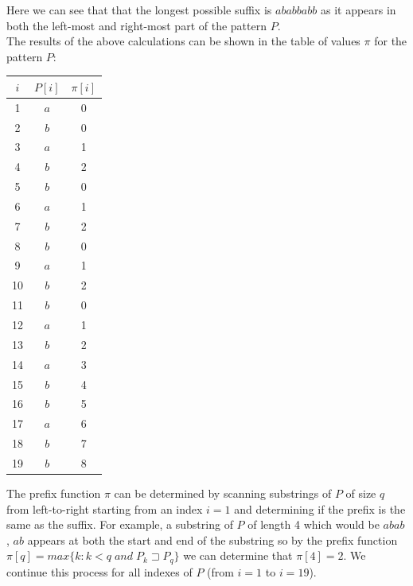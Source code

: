 \documentclass{article}
\begin{document}
Here we can see that that the longest possible suffix is $ababbabb$ as it appears in both the left-most and right-most part of the pattern $P$.\\

The results of the above calculations can be shown in the table of values $\pi$ for the pattern $P$:
\begin{center}
\begin{tabular}{||c c c||} 
 \hline
 $i$ & $P[i]$ & $\pi[i]$\\ [0.5ex] 
 \hline\hline
 1 & $a$ & 0 \\ 
 \hline
 2 & $b$ & 0 \\
 \hline
 3 & $a$ & 1 \\
 \hline
 4 & $b$ & 2 \\
 \hline
  5 & $b$ & 0 \\
 \hline
  6 & $a$ & 1 \\
 \hline
  7 & $b$ & 2 \\
 \hline
  8 & $b$ & 0 \\
 \hline
  9 & $a$ & 1 \\
 \hline
  10 & $b$ & 2 \\
 \hline
  11 & $b$ & 0 \\
 \hline
  12 & $a$ & 1 \\
 \hline
  13 & $b$ & 2 \\
 \hline
  14 & $a$ & 3 \\
 \hline
  15 & $b$ & 4 \\
 \hline
  16 & $b$ & 5 \\
 \hline
  17 & $a$ & 6 \\
 \hline
  18 & $b$ & 7 \\
 \hline
  19 & $b$ & 8 \\
  \hline
\end{tabular}
\end{center}


The prefix function $\pi$ can be determined by scanning substrings of $P$ of size $q$ from left-to-right starting from an index $i=1$ and determining if the prefix is the same as the suffix. For example, a substring of $P$ of length 4 which would be $abab$, $ab$ appears at both the start and end of the substring so by the prefix function $\pi[q] = max\{k:k<q \; and \; P_k \sqsupset P_q\}$ we can determine that $\pi[4] = 2$. We continue this process for all indexes of $P$ (from $i=1$ to $i=19$).
\end{document}
